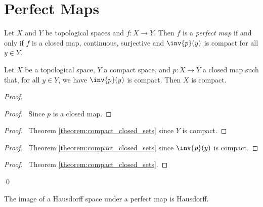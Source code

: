 \section{Perfect Maps}

\begin{definition}
    Let $X$ and $Y$ be topological spaces and $f : X \rightarrow Y$. Then $f$ is a \emph{perfect map} if and only if $f$ is a closed map, continuous,
    surjective and $\inv{p}(y)$ is compact for all $y \in Y$.
\end{definition}

\begin{proposition}
    \label{proposition:compact_pre_image}
    Let $X$ be a topological space, $Y$ a compact space, and $p : X \rightarrow Y$ a closed map such that, for all $y \in Y$, we have $\inv{p}(y)$ is compact. Then $X$ is compact.
\end{proposition}

\begin{proof}
    \pf
    \begin{proof}
        \pf\ Since $p$ is a closed map.
    \end{proof}
    \begin{proof}
        \pf\ Theorem \ref{theorem:compact_closed_sets} since $Y$ is compact.
    \end{proof}
    \begin{proof}
        \pf\ Theorem \ref{theorem:compact_closed_sets} since $\inv{p}(y)$ is compact.
    \end{proof}
    \qedstep
    \begin{proof}
        \pf\ Theorem \ref{theorem:compact_closed_sets}.
    \end{proof}
    \qed
\end{proof}

\begin{proposition}
    \label{proposition:perfect_image_Hausdorff}
    The image of a Hausdorff space under a perfect map is Hausdorff.
\end{proposition}

